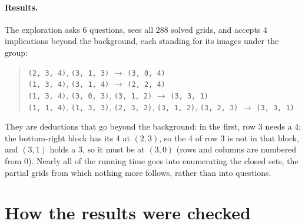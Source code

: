 \documentclass[11pt,a4paper]{article}
\theoremstyle{definition}
\theoremstyle{remark}
\begin{document}
\paragraph{Results.} The exploration asks 6 questions, sees all $288$ solved grids, and accepts 4 implications beyond the background, each standing for its images under the group:
\begin{quote}\small\raggedright
\texttt{(2,~3,~4)}, \allowbreak \texttt{(3,~1,~3)} \;$\to$\; \texttt{(3,~0,~4)}\\
\texttt{(1,~3,~4)}, \allowbreak \texttt{(3,~1,~4)} \;$\to$\; \texttt{(2,~2,~4)}\\
\texttt{(1,~3,~4)}, \allowbreak \texttt{(3,~0,~3)}, \allowbreak \texttt{(3,~1,~2)} \;$\to$\; \texttt{(3,~3,~1)}\\
\texttt{(1,~1,~4)}, \allowbreak \texttt{(1,~3,~3)}, \allowbreak \texttt{(2,~3,~2)}, \allowbreak \texttt{(3,~1,~2)}, \allowbreak \texttt{(3,~2,~3)} \;$\to$\; \texttt{(3,~3,~1)}
\end{quote}
They are deductions that go beyond the background: in the first, row 3 needs a 4; the bottom-right block has its 4 at $(2, 3)$, so the 4 of row 3 is not in that block, and $(3, 1)$ holds a 3, so it must be at $(3, 0)$ (rows and columns are numbered from $0$). Nearly all of the running time goes into enumerating the closed sets, the partial grids from which nothing more follows, rather than into questions.

\section{How the results were checked}\label{sec:verification}
\end{document}
